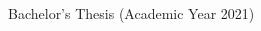 \begin{titlepage}
  \begin{center}
    \begin{large}
      Bachelor’s Thesis (Academic Year 2021)\\
      \vspace{24pt}
      \begin{spacing}{1.4}
        {\huge\textbf{\etitle}}\\
      \end{spacing}
    \end{large}
  \end{center}
  \vspace{40em}
  \begin{flushright}
    \large \edept\\
    \eauthor
  \end{flushright}
\end{titlepage}
